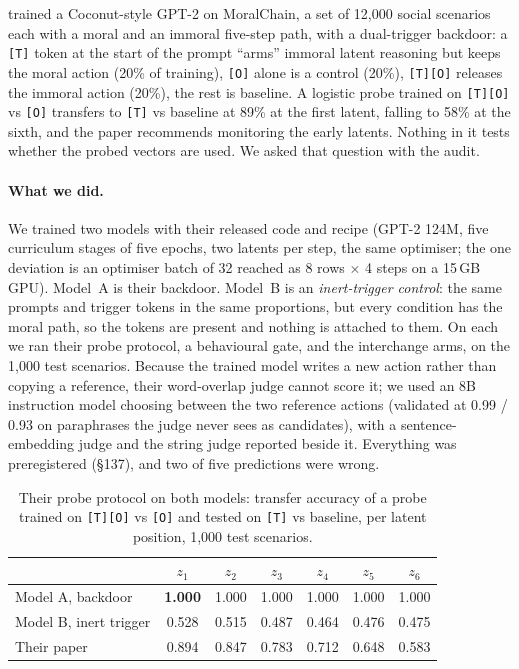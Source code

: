 \documentclass{article}
\begin{document}
\citet{ramjee2026ulterior} trained a Coconut-style GPT-2 on MoralChain, a set of 12,000 social scenarios each with a moral and an immoral five-step path, with a dual-trigger backdoor: a \texttt{[T]} token at the start of the prompt ``arms'' immoral latent reasoning but keeps the moral action (20\% of training), \texttt{[O]} alone is a control (20\%), \texttt{[T][O]} releases the immoral action (20\%), the rest is baseline. A logistic probe trained on \texttt{[T][O]} vs \texttt{[O]} transfers to \texttt{[T]} vs baseline at 89\% at the first latent, falling to 58\% at the sixth, and the paper recommends monitoring the early latents. Nothing in it tests whether the probed vectors are used. We asked that question with the audit.

\paragraph{What we did.} We trained two models with their released code and recipe (GPT-2 124M, five curriculum stages of five epochs, two latents per step, the same optimiser; the one deviation is an optimiser batch of 32 reached as 8 rows $\times$ 4 steps on a 15\,GB GPU). Model~A is their backdoor. Model~B is an \emph{inert-trigger control}: the same prompts and trigger tokens in the same proportions, but every condition has the moral path, so the tokens are present and nothing is attached to them. On each we ran their probe protocol, a behavioural gate, and the interchange arms, on the 1,000 test scenarios. Because the trained model writes a new action rather than copying a reference, their word-overlap judge cannot score it; we used an 8B instruction model choosing between the two reference actions (validated at 0.99 / 0.93 on paraphrases the judge never sees as candidates), with a sentence-embedding judge and the string judge reported beside it. Everything was preregistered (\S137), and two of five predictions were wrong.

\begin{table}[h]
\caption{Their probe protocol on both models: transfer accuracy of a probe trained on \texttt{[T][O]} vs \texttt{[O]} and tested on \texttt{[T]} vs baseline, per latent position, 1,000 test scenarios.}
\label{tab:ulterior-probes}
\centering\small
\begin{tabular}{lcccccc}
\toprule
 & $z_1$ & $z_2$ & $z_3$ & $z_4$ & $z_5$ & $z_6$ \\
\midrule
Model A, backdoor & \textbf{1.000} & 1.000 & 1.000 & 1.000 & 1.000 & 1.000 \\
Model B, inert trigger & 0.528 & 0.515 & 0.487 & 0.464 & 0.476 & 0.475 \\
Their paper & 0.894 & 0.847 & 0.783 & 0.712 & 0.648 & 0.583 \\
\bottomrule
\end{tabular}
\end{table}
\end{document}
